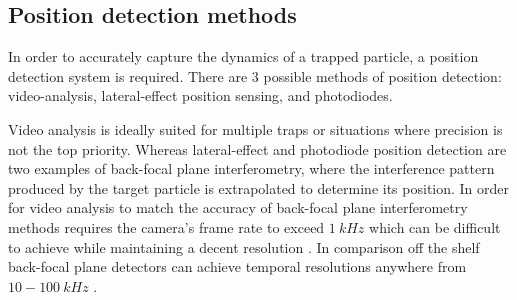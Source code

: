 \subsection{Position detection methods}
\label{sec:position_detection}
In order to accurately capture the dynamics of a trapped particle, a 
position detection system is required. There are 3 possible methods 
of position detection: video-analysis, lateral-effect position sensing, 
and photodiodes. 

Video analysis is ideally suited for multiple traps or situations where 
precision is not the top priority. Whereas lateral-effect and photodiode 
position detection are two examples of back-focal plane interferometry, 
where the interference pattern produced by the target particle is 
extrapolated to determine its position. In order for video analysis to 
match the accuracy of back-focal plane interferometry methods requires 
the camera's frame rate to exceed $1\ kHz$ which can be difficult to 
achieve while maintaining a decent resolution \cite{Gibson2008}. In 
comparison off the shelf back-focal plane detectors can achieve temporal 
resolutions anywhere from $10-100\ kHz$ \cite{BergSoerensen2004}. 
 
